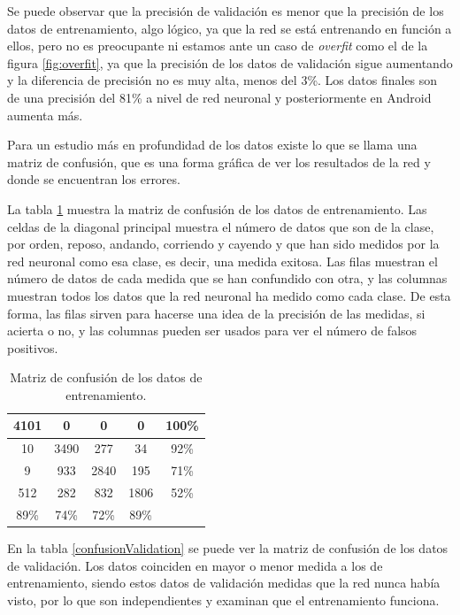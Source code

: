 \documentclass[12pt]{book}
\numberwithin{equation}{section}
\begin{document}
\newpage
Se puede observar que la precisión de validación es menor que la precisión de los datos de entrenamiento, algo lógico, ya que la red se está entrenando en función a ellos, pero no es preocupante ni estamos ante un caso de \textit{overfit} como el de la figura \ref{fig:overfit}, ya que la precisión de los datos de validación sigue aumentando y la diferencia de precisión no es muy alta, menos del 3\%. Los datos finales son de una precisión del 81\% a nivel de red neuronal y posteriormente en Android aumenta más.

Para un estudio más en profundidad de los datos existe lo que se llama una matriz de confusión, que es una forma gráfica de ver los resultados de la red y donde se encuentran los errores.

La tabla \ref{confusionTraining} muestra la matriz de confusión de los datos de entrenamiento. Las celdas de la diagonal principal muestra el número de datos que son de la clase, por orden, reposo, andando, corriendo y cayendo y que han sido medidos por la red neuronal como esa clase, es decir, una medida exitosa. Las filas muestran el número de datos de cada medida que se han confundido con otra, y las columnas muestran todos los datos que la red neuronal ha medido como cada clase. De esta forma, las filas sirven para hacerse una idea de la precisión de las medidas, si acierta o no, y las columnas pueden ser usados para ver el número de falsos positivos.

\begin{table}[h]
\centering
\begin{tabular} {| c | c | c | c | c |}
  \hline
  \cellcolor{green!25}4101 & 0 & 0 & 0 & 100\% \\
  \hline
  10 & \cellcolor{green!25}3490 & 277 & 34 & 92\% \\
  \hline
  9 & 933 & \cellcolor{green!25}2840 & 195 & 71\% \\
  \hline
  512 & 282 & 832 & \cellcolor{green!25}1806 & 52\% \\
  \hline
  89\% & 74\% & 72\% & 89\% & \\
  \hline
\end{tabular}
\caption{Matriz de confusión de los datos de entrenamiento.}
\label{confusionTraining}
\end{table}

En la tabla \ref{confusionValidation} se puede ver la matriz de confusión de los datos de validación. Los datos coinciden en mayor o menor medida a los de entrenamiento, siendo estos datos de validación medidas que la red nunca había visto, por lo que son independientes y examinan que el entrenamiento funciona.
\end{document}
